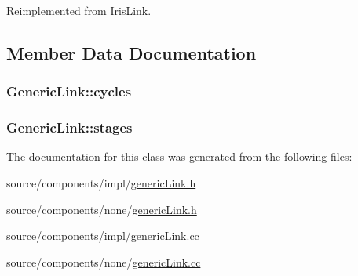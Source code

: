 Reimplemented from \hyperlink{classIrisLink_d25db1c98385d7abd82180e5746813a6}{IrisLink}.

\subsection{Member Data Documentation}
\hypertarget{classGenericLink_b4188829f4bf0096117b2d81517f1201}{
\subsubsection[{cycles}]{ {\bf GenericLink::cycles}}}
\label{classGenericLink_b4188829f4bf0096117b2d81517f1201}


\hypertarget{classGenericLink_7c2197f0b770d473c2ee0305967bfad7}{
\subsubsection[{stages}]{ {\bf GenericLink::stages}}}
\label{classGenericLink_7c2197f0b770d473c2ee0305967bfad7}




The documentation for this class was generated from the following files:\begin{CompactItemize}
\item 
source/components/impl/\hyperlink{impl_2genericLink_8h}{genericLink.h}\item 
source/components/none/\hyperlink{none_2genericLink_8h}{genericLink.h}\item 
source/components/impl/\hyperlink{impl_2genericLink_8cc}{genericLink.cc}\item 
source/components/none/\hyperlink{none_2genericLink_8cc}{genericLink.cc}\end{CompactItemize}
